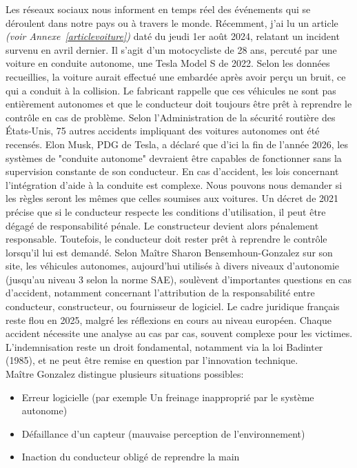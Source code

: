 Les réseaux sociaux nous informent en temps réel des événements qui se déroulent dans notre pays ou à travers le monde. 
Récemment, j'ai lu un article \emph{(voir Annexe~\ref{articlevoiture})} daté du jeudi 1er août 2024, relatant un incident survenu en avril dernier. Il s'agit d'un motocycliste de 28 ans, percuté par une voiture en conduite autonome, une Tesla Model S de 2022. Selon les données recueillies, la voiture aurait effectué une embardée après avoir perçu un bruit, ce qui a conduit à la collision. Le fabricant rappelle que ces véhicules ne sont pas entièrement autonomes et que le conducteur doit toujours être prêt à reprendre le contrôle en cas de problème. Selon l'Administration de la sécurité routière des États-Unis, 75 autres accidents impliquant des voitures autonomes ont été recensés. 
Elon Musk, PDG de Tesla, a déclaré que d'ici la fin de l'année 2026, les systèmes de "conduite autonome" devraient être capables de fonctionner sans la supervision constante de son conducteur.
En cas d'accident, les lois concernant l'intégration d'aide à la conduite est complexe. Nous pouvons nous demander si les règles seront les mêmes que celles soumises aux voitures. Un décret de 2021 précise que si le conducteur respecte les conditions d’utilisation, il peut être dégagé de responsabilité pénale. Le constructeur devient alors pénalement responsable. Toutefois, le conducteur doit rester prêt à reprendre le contrôle lorsqu’il lui est demandé. Selon  Maître Sharon Bensemhoun-Gonzalez sur son site\cite{avocat}, les véhicules autonomes, aujourd’hui utilisés à divers niveaux d’autonomie (jusqu’au niveau 3 selon la norme SAE), soulèvent d’importantes questions en cas d’accident, notamment concernant l’attribution de la responsabilité entre conducteur, constructeur, ou fournisseur de logiciel. Le cadre juridique français reste flou en 2025, malgré les réflexions en cours au niveau européen. Chaque accident nécessite une analyse au cas par cas, souvent complexe pour les victimes. L’indemnisation reste un droit fondamental, notamment via la loi Badinter (1985), et ne peut être remise en question par l’innovation technique.\\
Maître Gonzalez distingue plusieurs situations possibles:
\begin{itemize}
    \item Erreur logicielle (par exemple Un freinage inapproprié par le système autonome)
    \item Défaillance d’un capteur (mauvaise perception de l’environnement)
    \item Inaction du conducteur obligé de reprendre la main 
\end{itemize}
